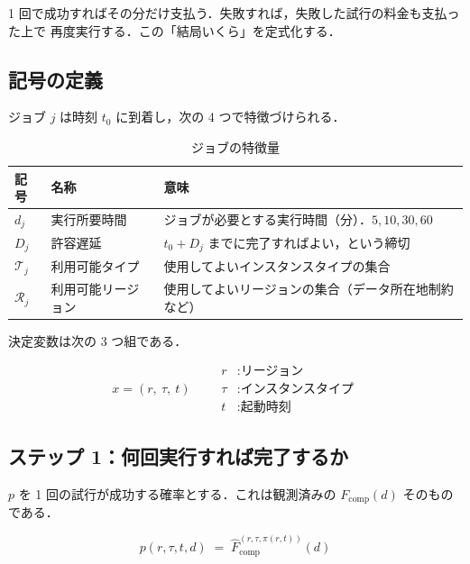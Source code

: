 \documentclass[11pt,a4paper]{ltjsarticle}
\newcommand{\Fcomp}{F_{\mathrm{comp}}}
\begin{document}
1 回で成功すればその分だけ支払う．失敗すれば，失敗した試行の料金も支払った上で
再度実行する．この「結局いくら」を定式化する．

\subsection{記号の定義}

ジョブ $j$ は時刻 $t_0$ に到着し，次の 4 つで特徴づけられる．

\begin{table}[htbp]
\centering
\caption{ジョブの特徴量}
\label{tab:job}
\begin{tabularx}{\textwidth}{@{}llX@{}}
\toprule
記号 & 名称 & 意味 \\
\midrule
$d_j$ & 実行所要時間 & ジョブが必要とする実行時間（分）．$5,10,30,60$ \\
$D_j$ & 許容遅延 & $t_0 + D_j$ までに完了すればよい，という締切 \\
$\mathcal{T}_j$ & 利用可能タイプ & 使用してよいインスタンスタイプの集合 \\
$\mathcal{R}_j$ & 利用可能リージョン & 使用してよいリージョンの集合（データ所在地制約など） \\
\bottomrule
\end{tabularx}
\end{table}

決定変数は次の 3 つ組である．

\begin{equation}
x = (r,\ \tau,\ t)
\qquad
\begin{aligned}
r &: \text{リージョン} \\
\tau &: \text{インスタンスタイプ} \\
t &: \text{起動時刻}
\end{aligned}
\end{equation}

\subsection{ステップ 1：何回実行すれば完了するか}

$p$ を 1 回の試行が成功する確率とする．これは観測済みの $\Fcomp(d)$ そのものである．

\begin{equation}
p(r,\tau,t,d) \;=\; \hat{F}_{\mathrm{comp}}^{(r,\tau,\pi(r,t))}(d)
\label{eq:p}
\end{equation}
\end{document}
